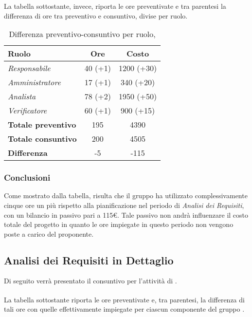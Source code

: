La tabella sottostante, invece, riporta le ore preventivate e  tra parentesi la differenza di ore tra preventivo e consuntivo, divise per ruolo.

\begin{table}[H]
	\begin{center}
		\begin{tabular}{|l|c|c|}
			\hline
			\textbf{Ruolo}	& \textbf{Ore} & \textbf{Costo} \\
			\hline
			\textit{Responsabile}		&	40 (+1)	&	1200 (+30)	\\
			\hline
			\textit{Amministratore}		&	17 (+1)	&	340 (+20)	\\
			\hline
			\textit{Analista}			&	78 (+2)	&	1950 (+50)	\\
			\hline
			\textit{Verificatore}		&	60 (+1)	&	900 (+15)	\\
			\hline
			\textbf{Totale preventivo}	&	195		&	4390 		\\
			\hline
			\textbf{Totale consuntivo}	&	200		&   4505		\\
			\hline
			\textbf{Differenza} 		&	-5		&	-115		\\
			\hline
		\end{tabular}
	\end{center}
	\caption{Differenza preventivo-consuntivo per ruolo, \AdR}
\end{table}
 
\subsubsection{Conclusioni}

Come mostrato dalla tabella, risulta che il gruppo ha utilizzato complessivamente cinque ore un più rispetto alla pianificazione nel periodo di \textit{Analisi dei Requisiti}, con un bilancio in passivo pari a 115€. Tale passivo non andrà influenzare il costo totale del progetto in quanto le ore impiegate in questo periodo non vengono poste a carico del proponente.

\subsection{Analisi dei Requisiti in Dettaglio}
Di seguito verrà presentato il consuntivo per l'attività di \textit{\AD}.
\\\\
La tabella sottostante riporta le ore preventivate e, tra parentesi, la differenza di tali ore con quelle effettivamente impiegate per ciascun componente del gruppo \gruppo.

